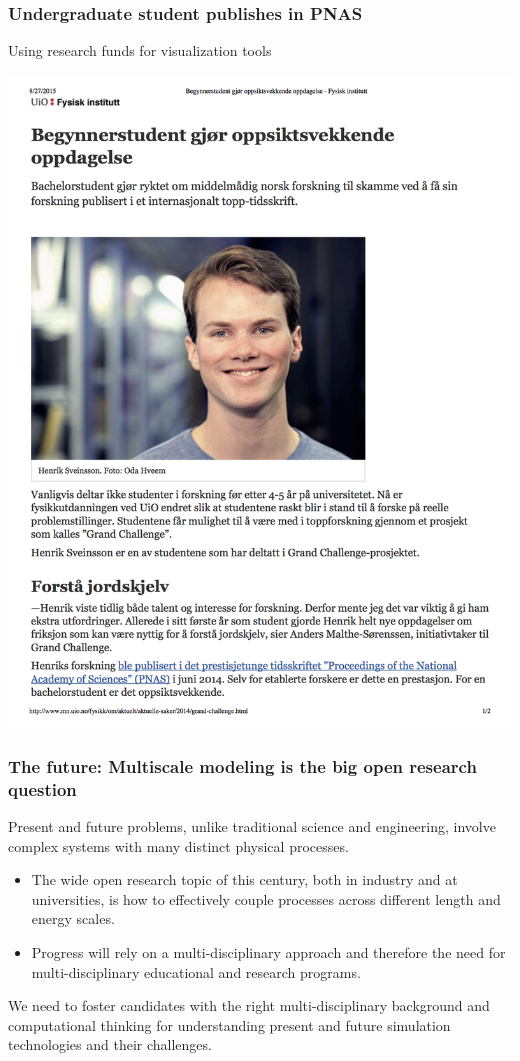\documentclass{beamer}
\begin{document}
\begin{frame}
\frametitle{Undergraduate student publishes in PNAS}

\begin{block}{Using research funds for visualization tools }


\centerline{\includegraphics[width=0.7\linewidth]{fig-future/pnas.png}}



\end{block}
\end{frame}

\begin{frame}
\frametitle{The future: Multiscale modeling is the big open research question}

\begin{block}{}
Present and future problems, unlike traditional
science and engineering, involve complex systems with many distinct
physical processes. 
\begin{itemize}
\item The wide open research topic of this century, both in industry and at universities, is how to effectively couple processes across different length and energy scales. 

\item Progress will rely on a multi-disciplinary approach and therefore the  need for multi-disciplinary educational and research programs.
\end{itemize}

\noindent
\end{block}

\begin{block}{}
We need to foster candidates with the right
multi-disciplinary background and computational thinking for
understanding present and future simulation technologies and their challenges.
\end{block}
\end{frame}
\end{document}
